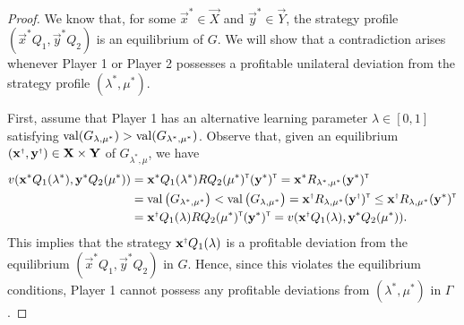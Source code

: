     \begin{proof}
        We know that, for some $\vec{x}^* \in \vec{X}$ and $\vec{y}^* \in \vec{Y}$, the strategy profile $(\vec{x}^* Q_1, \vec{y}^* Q_2)$ is an equilibrium of $G$.
        We will show that a contradiction arises whenever Player 1 or Player 2 possesses a profitable unilateral deviation from the strategy profile $(\lambda^*, \mu^*)$.

        First, assume that Player 1 has an alternative learning parameter $\lambda \in [0, 1]$ satisfying $\operatorname{val}(G_{\lambda, \mu^*}) > \operatorname{val}(G_{\lambda^*, \mu^*})$.
        Observe that, given an equilibrium $(\vec{x}^\sdagger, \vec{y}^\sdagger) \in \vec{X} \times \vec{Y}$ of $G_{\lambda^*, \mu}$, we have
        \begin{equation} \label{temp:optimal-learning-parameters-sufficient-1}
        \begin{split}
            v(\vec{x}^* Q_1(\lambda^*), \vec{y}^* Q_2(\mu^*))
                & = \vec{x}^* Q_1(\lambda^*) R Q_2(\mu^*)^\transp (\vec{y}^*)^\transp
                = \vec{x}^* R_{\lambda^*, \mu^*} (\vec{y}^*)^\transp \\
                & = \val\big(G_{\lambda^*, \mu^*}\big)
                < \val\big(G_{\lambda, \mu^*}\big)
                = \vec{x}^\sdagger R_{\lambda, \mu^*} (\vec{y}^\sdagger)^\transp
                \le \vec{x}^\sdagger R_{\lambda, \mu^*} (\vec{y}^*)^\transp \\
                & = \vec{x}^\sdagger Q_1(\lambda) R Q_2(\mu^*)^\transp (\vec{y}^*)^\transp
                = v(\vec{x}^\sdagger Q_1(\lambda), \vec{y}^* Q_2(\mu^*)).
        \end{split}
        \end{equation}
        This implies that the strategy $\vec{x}^\sdagger Q_1(\lambda)$ is a profitable deviation from the equilibrium $(\vec{x}^* Q_1, \vec{y}^* Q_2)$ in $G$.
        Hence, since this violates the equilibrium conditions, Player 1 cannot possess any profitable deviations from $(\lambda^*, \mu^*)$ in $\Gamma$.


\end{proof}
